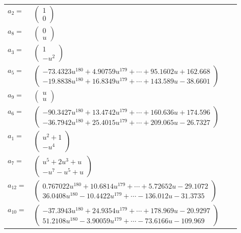 \documentclass[1p]{elsarticle_modified}
\theoremstyle{definition}
\begin{document}
\begin{tabular}{m{7pt} m{180pt} m{7pt} m{180pt} }
\flushright $a_{2}=$&$\begin{pmatrix}1\\0\end{pmatrix}$ \\
\flushright $a_{8}=$&$\begin{pmatrix}0\\u\end{pmatrix}$ \\
\flushright $a_{3}=$&$\begin{pmatrix}1\\- u^2\end{pmatrix}$ \\
\flushright $a_{5}=$&$\begin{pmatrix}-73.4323 u^{180}+4.90759 u^{179}+\cdots+95.1602 u+162.668\\-19.8838 u^{180}+16.8349 u^{179}+\cdots+143.589 u-38.6601\end{pmatrix}$ \\
\flushright $a_{9}=$&$\begin{pmatrix}u\\u\end{pmatrix}$ \\
\flushright $a_{6}=$&$\begin{pmatrix}-90.3427 u^{180}+13.4742 u^{179}+\cdots+160.636 u+174.596\\-36.7942 u^{180}+25.4015 u^{179}+\cdots+209.065 u-26.7327\end{pmatrix}$ \\
\flushright $a_{1}=$&$\begin{pmatrix}u^2+1\\- u^4\end{pmatrix}$ \\
\flushright $a_{7}=$&$\begin{pmatrix}u^5+2 u^3+u\\- u^7- u^5+u\end{pmatrix}$ \\
\flushright $a_{12}=$&$\begin{pmatrix}0.767022 u^{180}+10.6814 u^{179}+\cdots+5.72652 u-29.1072\\36.0408 u^{180}-10.4422 u^{179}+\cdots-136.012 u-31.3735\end{pmatrix}$ \\
\flushright $a_{10}=$&$\begin{pmatrix}-37.3943 u^{180}+24.9354 u^{179}+\cdots+178.969 u-20.9297\\51.2108 u^{180}-3.90059 u^{179}+\cdots-73.6166 u-109.969\end{pmatrix}$ \\

\end{tabular}
\end{document}

